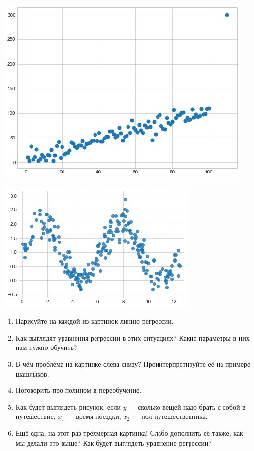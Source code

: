 \documentclass[12pt, a4paper, oneside]{article}
\begin{document}
\begin{minipage}[t]{0.45\textwidth}
	\includegraphics[scale=0.4]{regr_pic_3.png}
\end{minipage}
\hfill
\begin{minipage}[t]{0.45\textwidth}
	\includegraphics[scale=0.55]{regr_pic_4.png}
\end{minipage}

\begin{enumerate}	
	\item Нарисуйте на каждой из картинок линию регрессии.
	\item Как выглядят уравнения регрессии в этих ситуациях? Какие параметры в них нам нужно обучить?
	\item В чём проблема на картинке слева снизу? Проинтерпретируйте её на примере шашлыков.
	\item Поговорить про полином и переобучение.
	\item Как будет выглядеть рисунок, если $y$ — сколько вещей надо брать с собой в путешествие, $x_1$ — время поездки, $x_2$ — пол путешественника.
	\item Ещё одна, на этот раз трёхмерная картинка! Слабо дополнить её также, как мы делали это выше? Как будет выглядеть уравнение регрессии?
\end{enumerate}
\end{document}
